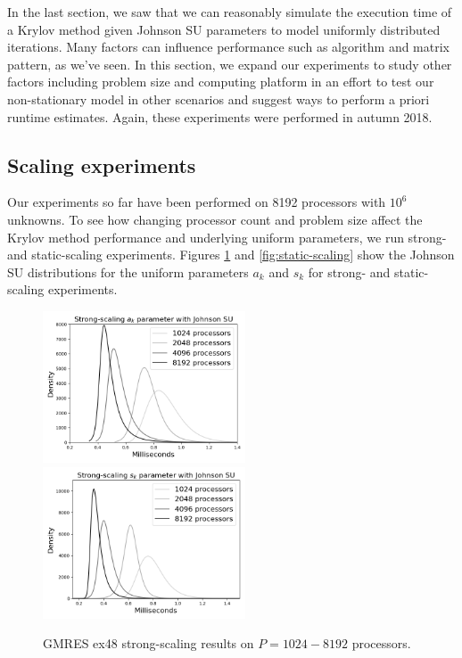 \documentclass[sigconf]{acmart}
\begin{document}
In the last section, we saw that we can reasonably simulate the execution time of a Krylov method given Johnson SU parameters to model uniformly distributed iterations. 
Many factors can influence performance such as algorithm and matrix pattern, as we've seen. 
In this section, we expand our experiments to study other factors including problem size and computing platform in an effort to test our non-stationary model in other scenarios and suggest ways to perform a priori runtime estimates.
Again, these experiments were performed in autumn 2018. 

\subsection{Scaling experiments}\label{sec:scaling}


Our experiments so far have been performed on 8192 processors with $10^6$ unknowns.
To see how changing processor count and problem size affect the Krylov method performance and underlying uniform parameters, we run strong- and static-scaling experiments.
Figures \ref{fig:strong-scaling} and \ref{fig:static-scaling} show the Johnson SU distributions for the uniform parameters $a_k$ and $s_k$ for strong- and static-scaling experiments. 


\begin{figure}[t]
\centering
\includegraphics[width=6cm]{../plots/GMRES_ex48_1000000_a_k_strong_scaling_johnsonsu.png}
\includegraphics[width=6cm]{../plots/PGMRES_ex48_1000000_s_k_strong_scaling_johnsonsu.png} 
\caption{GMRES ex48 strong-scaling results on $P = 1024 - 8192$ processors.} \label{fig:strong-scaling}
\end{figure}
 
\end{document}
